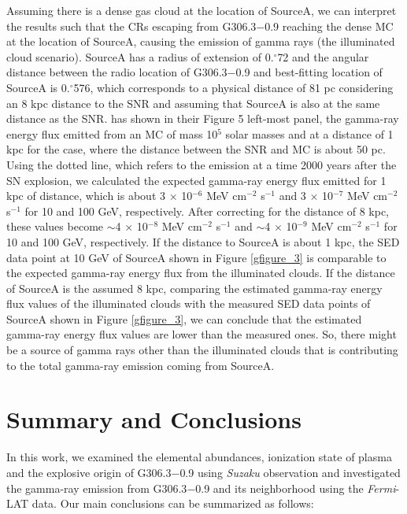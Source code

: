 \documentclass[useAMS,usenatbib]{mn2e}
\begin{document}
Assuming there is a dense gas cloud at the location of SourceA, we can interpret the results such that the CRs escaping from G306.3$-$0.9 reaching the dense MC at the location of SourceA, causing the emission of gamma rays (the illuminated cloud scenario). SourceA has a radius of extension of 0.$\!\!^{\circ}$72 and the angular distance between the radio location of G306.3$-$0.9 and best-fitting location of SourceA is 0.$\!\!^{\circ}$576, which corresponds to a physical distance of 81 pc considering an 8 kpc distance to the SNR and assuming that SourceA is also at the same distance as the SNR. \citet{Ga09} has shown in their Figure 5 left-most panel, the gamma-ray energy flux emitted from an MC of mass 10$^5$ solar masses and at a distance of 1 kpc for the case, where the distance between the SNR and MC is about 50 pc. 
Using the dotted line, which refers to the emission at a time 2000 years after the SN explosion, we calculated the expected gamma-ray energy flux emitted for 1 kpc of distance, which is about 3 $\times$ 10$^{-6}$ MeV cm$^{-2}$ s$^{-1}$ and 3 $\times$ 10$^{-7}$ MeV cm$^{-2}$ s$^{-1}$ for 10 and 100 GeV, respectively. After correcting for the distance of 8 kpc, these values become $\sim$4 $\times$ 10$^{-8}$ MeV cm$^{-2}$ s$^{-1}$ and $\sim$4 $\times$ 10$^{-9}$ MeV cm$^{-2}$ s$^{-1}$ for 10 and 100 GeV, respectively. If the distance to SourceA is about 1 kpc, the SED data point at 10 GeV of SourceA shown in Figure \ref{gfigure_3} is comparable to the expected gamma-ray energy flux from the illuminated clouds. If the distance of SourceA is the assumed 8 kpc, comparing the estimated gamma-ray energy flux values of the illuminated clouds with the measured SED data points of SourceA shown in Figure \ref{gfigure_3}, we can conclude that the estimated gamma-ray energy flux values are lower than the measured ones. So, there might be a source of gamma rays other than the illuminated clouds that is contributing to the total gamma-ray emission coming from SourceA.

\section{Summary and Conclusions}
In this work, we examined the elemental abundances, ionization state of plasma and the explosive origin of G306.3$-$0.9 using {\it Suzaku} observation and investigated the gamma-ray emission from G306.3$-$0.9 and its neighborhood using the {\it Fermi}-LAT data. Our main conclusions can be summarized as follows:
\end{document}

